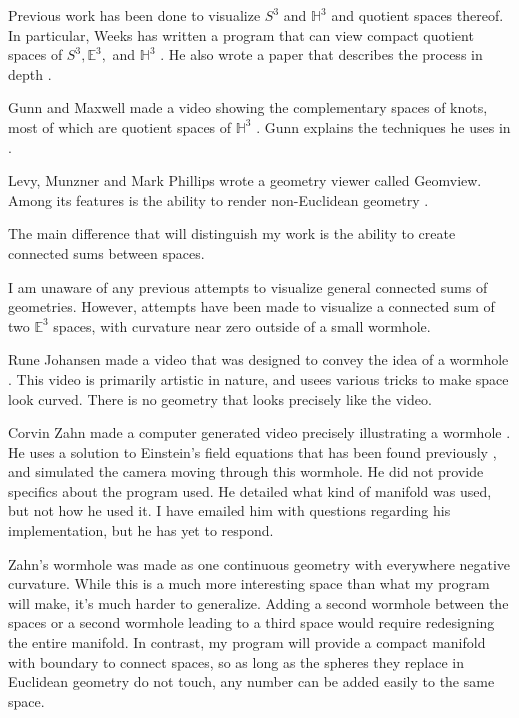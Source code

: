 



Previous work has been done to visualize $S^3$ and $\mathbb{H}^3$ and quotient spaces thereof. In particular, Weeks has written a program that can view compact quotient spaces of $S^3, \mathbb{E}^3,$ and $\mathbb{H}^3$ \cite{CurvedSpaces}. He also wrote a paper that describes the process in depth \cite{CurvedSpacesPaper}.

Gunn and Maxwell made a video showing the complementary spaces of knots, most of which are quotient spaces of $\mathbb{H}^3$ \cite{NotKnot}. Gunn explains the techniques he uses in \cite{CharlieGunn} \cite{CharlieGunn2}.

Levy, Munzner and Mark Phillips wrote a geometry viewer called Geomview. Among its features is the ability to render non-Euclidean geometry \cite{Geomview}.

The main difference that will distinguish my work is the ability to create connected sums between spaces.



I am unaware of any previous attempts to visualize general connected sums of geometries. However, attempts have been made to visualize a connected sum of two $\mathbb{E}^3$ spaces, with curvature near zero outside of a small wormhole.

Rune Johansen made a video that was designed to convey the idea of a wormhole \cite{runevision}. This video is primarily artistic in nature, and usees various tricks to make space look curved. There is no geometry that looks precisely like the video.

Corvin Zahn made a computer generated video precisely illustrating a wormhole \cite{spacetimetravel}. He uses a solution to Einstein's field equations that has been found previously \cite{WormholeSolution}, and simulated the camera moving through this wormhole. He did not provide specifics about the program used. He detailed what kind of manifold was used, but not how he used it. I have emailed him with questions regarding his implementation, but he has yet to respond.

Zahn's wormhole was made as one continuous geometry with everywhere negative curvature. While this is a much more interesting space than what my program will make, it's much harder to generalize. Adding a second wormhole between the spaces or a second wormhole leading to a third space would require redesigning the entire manifold. In contrast, my program will provide a compact manifold with boundary to connect spaces, so as long as the spheres they replace in Euclidean geometry do not touch, any number can be added easily to the same space.

